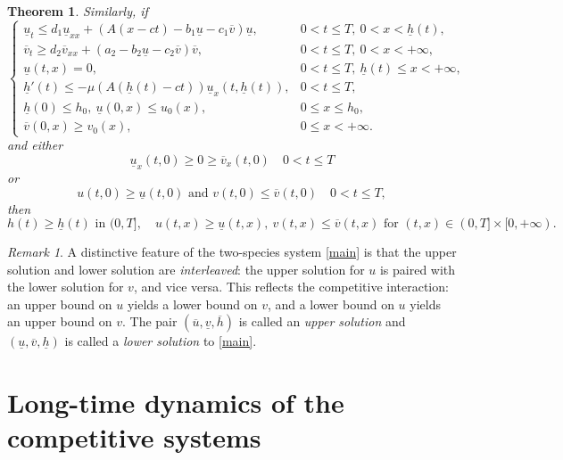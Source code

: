 \documentclass[reqno]{amsart}
\theoremstyle{plain}
\newtheorem{theorem}{Theorem}
\theoremstyle{definition}
\theoremstyle{remark}
\newtheorem{remark}{Remark}
\begin{document}
\begin{theorem}
		Similarly, if
		\[
		\begin{cases}
			\underline{u}_t \le d_1\underline{u}_{xx}
			+ (A(x - ct) - b_1\underline{u} - c_1 \overline{v}) \underline{u},
			& 0 < t \le T,~ 0 < x < \underline{h}(t), \\
			\overline{v}_t \ge d_2\overline{v}_{xx}
			+ (a_2 - b_2\underline{u} - c_2\overline{v})\overline{v},
			& 0 < t \le T,~ 0 < x < +\infty, \\
			\underline{u}(t, x) = 0,
			& 0 < t \le T, ~ \underline{h}(t) \leq x < +\infty, \\
			\underline{h}'(t) \le -\mu (A(\underline{h}(t) - ct))\underline{u}_x(t, \underline{h}(t)),
			& 0 < t \le T, \\
			\underline{h}(0) \le h_0,~ \underline{u}(0, x) \le u_0(x),
			& 0 \leq x \leq h_0, \\
			\overline{v}(0, x) \ge v_0(x),
			& 0 \le x < +\infty.
		\end{cases}
		\]		
		and either
		\[
		\underline{u}_x(t, 0) \ge 0 \ge \overline{v}_x(t, 0) \quad 0 < t \le T
		\]
		or
		\[
		u(t,0) \ge \underline{u}(t,0) \text{ and } v(t,0) \le \overline{v}(t,0)  \quad 0 < t \le T,
		\]
		then
		\[
		h(t) \ge \underline{h}(t) \text{ in } (0,T],\quad
		u(t,x) \ge \underline{u}(t,x),~ v(t,x) \le \overline{v}(t,x)
		\text{ for } (t,x) \in (0,T] \times [0,+\infty).
		\]
	\end{theorem}
	
	\begin{remark}
		A distinctive feature of the two-species system \eqref{main} is that the upper solution and lower solution are \emph{interleaved}: the upper solution for $u$
		is paired with the lower solution for $v$, and vice versa. This reflects the
		competitive interaction: an upper bound on $u$ yields a lower bound on $v$, and
		a lower bound on $u$ yields an upper bound on $v$. The pair $(\overline{u},
		\underline{v}, \overline{h})$ is called an \textit{upper solution} and $(\underline{u},
		\overline{v}, \underline{h})$ is called a \textit{lower solution} to \eqref{main}.
	\end{remark}
	
	\section{Long-time dynamics of the competitive systems}\label{sec_3}
	
\end{document}
